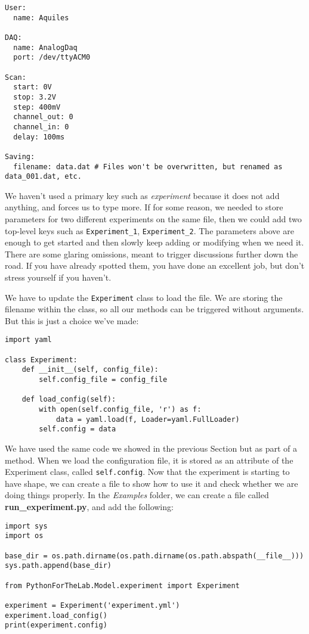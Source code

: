 \begin{verbatim}
User:
  name: Aquiles

DAQ:
  name: AnalogDaq
  port: /dev/ttyACM0

Scan:
  start: 0V
  stop: 3.2V
  step: 400mV
  channel_out: 0
  channel_in: 0
  delay: 100ms

Saving:
  filename: data.dat # Files won't be overwritten, but renamed as data_001.dat, etc.
\end{verbatim}

We haven't used a primary key such as \emph{experiment} because it does not add anything, and forces us to type more. If for some reason, we needed to store parameters for two different experiments on the same file, then we could add two top-level keys such as \texttt{Experiment\_1}, \texttt{Experiment\_2}. The parameters above are enough to get started and then slowly keep adding or modifying when we need it. There are some glaring omissions, meant to trigger discussions further down the road. If you have already spotted them, you have done an excellent job, but don't stress yourself if you haven't.

We have to update the \texttt{Experiment} class to load the file. We are storing the filename within the class, so all our methods can be triggered without arguments. But this is just a choice we've made:

\begin{verbatim}
import yaml

class Experiment:
    def __init__(self, config_file):
        self.config_file = config_file

    def load_config(self):
        with open(self.config_file, 'r') as f:
            data = yaml.load(f, Loader=yaml.FullLoader)
        self.config = data
\end{verbatim}

We have used the same code we showed in the previous Section but as part of a method. When we load the configuration file, it is stored as an attribute of the Experiment class, called \texttt{self.config}. Now that the experiment is starting to have shape, we can create a file to show how to use it and check whether we are doing things properly. In the \emph{Examples} folder, we can create a file called \textbf{run\_experiment.py}, and add the following:

\begin{verbatim}
import sys
import os

base_dir = os.path.dirname(os.path.dirname(os.path.abspath(__file__)))
sys.path.append(base_dir)

from PythonForTheLab.Model.experiment import Experiment

experiment = Experiment('experiment.yml')
experiment.load_config()
print(experiment.config)
\end{verbatim}

